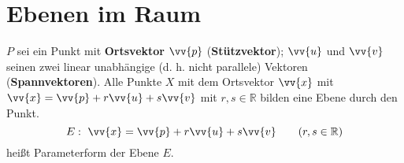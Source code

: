 \section{Ebenen im Raum}

\begin{satz}
    $P$ sei ein Punkt mit \textbf{Ortsvektor} $\vv{p}$ (\textbf{Stützvektor}); $\vv{u}$ und $\vv{v}$ seinen zwei linear unabhängige (d. h. nicht parallele) Vektoren (\textbf{Spannvektoren}). Alle Punkte $X$ mit dem Ortsvektor $\vv{x}$ mit $\vv{x} = \vv{p} + r \vv{u} + s \vv{v}$ mit $r, s \in \mathbb{R}$ bilden eine Ebene durch den Punkt. 
    $$E: \ \vv{x} = \vv{p} + r \vv{u} + s \vv{v} \qquad (r, s \in \mathbb{R})$$
    heißt Parameterform der Ebene $E$.
    
\end{satz}
\def\t{0.9}
\def\s{0.04}
\def\tt{0.7}
\def\kk{0.7}
\def\ttt{0.324}
\def\sss{0.6666}
\def\tttt{0.4}
\def\ssss{0.4}
\def\ttttt{0.85}
\def\sssss{0.7}
\def\tttttt{0.7}
\def\ssssss{0.2}

